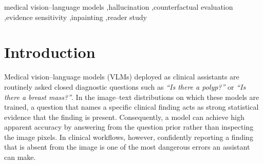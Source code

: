 \documentclass[5p,times,twocolumn,authoryear]{elsarticle}
\begin{document}
\begin{frontmatter}
\begin{abstract}
retraining with pneumothorax patients in every stage finds 53\% of pneumothoraxes on new patients without changing the main-test results.
\end{abstract}

\begin{keyword}
medical vision--language models \sep hallucination \sep counterfactual evaluation \sep evidence sensitivity \sep inpainting \sep reader study
\end{keyword}
\end{frontmatter}


\section{Introduction}
\label{sec:intro}
Medical vision--language models (VLMs) deployed as clinical assistants are routinely asked closed diagnostic questions such as \emph{``Is there a polyp?''} or \emph{``Is there a breast mass?''}. In the image--text distributions on which these models are trained, a question that names a specific clinical finding acts as strong statistical evidence that the finding is present. Consequently, a model can achieve high apparent accuracy by answering from the question prior rather than inspecting the image pixels. In clinical workflows, however, confidently reporting a finding that is absent from the image is one of the most dangerous errors an assistant can make.
\end{document}
